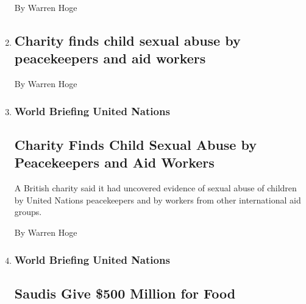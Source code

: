 \begin{enumerate}
  By Warren Hoge
\item
  \href{/2008/05/28/news/28iht-28briefscharityfindsbrf.13264773.html}{}

  \hypertarget{charity-finds-child-sexual-abuse-by-peacekeepers-and-aid-workers}{%
  \subsection{Charity finds child sexual abuse by peacekeepers and aid
  workers}\label{charity-finds-child-sexual-abuse-by-peacekeepers-and-aid-workers}}

  By Warren Hoge
\item
  \href{/2008/05/28/world/28briefs-CHARITYFINDS_BRF.html}{}

  \hypertarget{world-briefing--united-nations}{%
  \subsubsection{World Briefing \textbar{} United
  Nations}\label{world-briefing--united-nations}}

  \hypertarget{charity-finds-child-sexual-abuse-by-peacekeepers-and-aid-workers-1}{%
  \subsection{Charity Finds Child Sexual Abuse by Peacekeepers and Aid
  Workers}\label{charity-finds-child-sexual-abuse-by-peacekeepers-and-aid-workers-1}}

  A British charity said it had uncovered evidence of sexual abuse of
  children by United Nations peacekeepers and by workers from other
  international aid groups.

  By Warren Hoge
\item
  \href{/2008/05/24/world/middleeast/24briefs-SAUDISGIVE50_BRF.html}{}

  \hypertarget{world-briefing--united-nations-1}{%
  \subsubsection{World Briefing \textbar{} United
  Nations}\label{world-briefing--united-nations-1}}

  \hypertarget{saudis-give-500-million-for-food}{%
  \subsection{Saudis Give \$500 Million for
  Food}\label{saudis-give-500-million-for-food}}


\end{enumerate}
